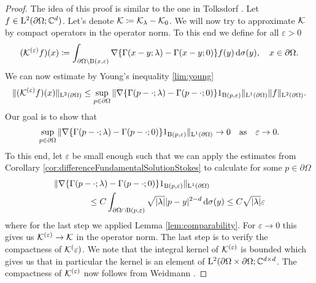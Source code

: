 \begin{proof}
  The idea of this proof is similar to the one in Tolksdorf \cite[Lemma 4.3.5]{tolksdorfDiss}.
  Let $f \in \mathrm{L}^2(\partial\Omega; \mathbb{C}^d)$.
  Let's denote $\mathcal{K} \coloneqq \mathcal{K}_\lambda - \mathcal{K}_0$. 
  We will now try to approximate $\mathcal{K}$ by compact operators in the operator norm.
  To this end we define for all $\varepsilon > 0$
  \begin{align*}
    (\mathcal{K}^{(\varepsilon)}f)(x) \coloneqq \int_{\partial\Omega \setminus \mathrm{B}(x,\varepsilon)} \nabla \{ \Gamma(x - y; \lambda) - \Gamma(x - y; 0) \} f(y) \, {\operatorname{d}\!{\sigma}}(y), \quad x \in \partial\Omega.
  \end{align*}
  We can now estimate by Young's inequality \ref{lim:young} 
  \begin{align*}
    \| (\mathcal{K}^{(\varepsilon)} f)(x) \|_{\mathrm{L}^2(\partial\Omega)}
    \leq \sup_{p \in \partial\Omega} \| \nabla \{ \Gamma(p - \cdot; \lambda) - \Gamma(p - \cdot; 0) \} 1_{\mathrm{B}(p,\varepsilon)} \|_{\mathrm{L}^1(\partial\Omega)} \|f\|_{\mathrm{L}^2(\partial\Omega)}.
  \end{align*}
  Our goal is to show that
  \begin{align*}
    \sup_{p \in \partial\Omega} \| \nabla \{ \Gamma(p - \cdot; \lambda) - \Gamma(p - \cdot; 0) \} 1_{\mathrm{B}(p,\varepsilon)} \|_{\mathrm{L}^1(\partial\Omega)} \to 0 \quad \text{as} \quad \varepsilon \to 0.
  \end{align*}
  To this end, let $\varepsilon$ be small enough such that we can apply the estimates from Corollary \ref{cor:differenceFundamentalSolutionStokes} to calculate for some $p \in \partial\Omega$
  \begin{align*}
     &\| \nabla \{ \Gamma(p - \cdot; \lambda) - \Gamma(p - \cdot; 0) \} 1_{\mathrm{B}(p,\varepsilon)} \|_{\mathrm{L}^1(\partial\Omega)}  \\
     &\qquad\qquad\leq C \int_{\partial\Omega \cap \mathrm{B}(p, \varepsilon)} \sqrt{|\lambda|} |p - y|^{2 - d} \, {\operatorname{d}\!{\sigma}}(y) 
     \leq C \sqrt{|\lambda|} \varepsilon
  \end{align*}
  where for the last step we applied Lemma \ref{lem:comparability}.
  For $\varepsilon \to 0$ this gives us $\mathcal{K}^{(\varepsilon)} \to \mathcal{K}$ in the operator norm.
  The last step is to verify the compactness of $\mathcal{K}^(\varepsilon)$.
  We note that the integral kernel of $\mathcal{K}^{(\varepsilon)}$ is bounded which gives us that in particular the kernel is an element of $\mathrm{L}^2(\partial\Omega \times \partial\Omega; \mathbb{C}^{d \times d}$.
  The compactness of $\mathcal{K}^{(\varepsilon)}$ now follows from Weidmann \cite[Thm. 6.11]{weidmann}.
\end{proof}

